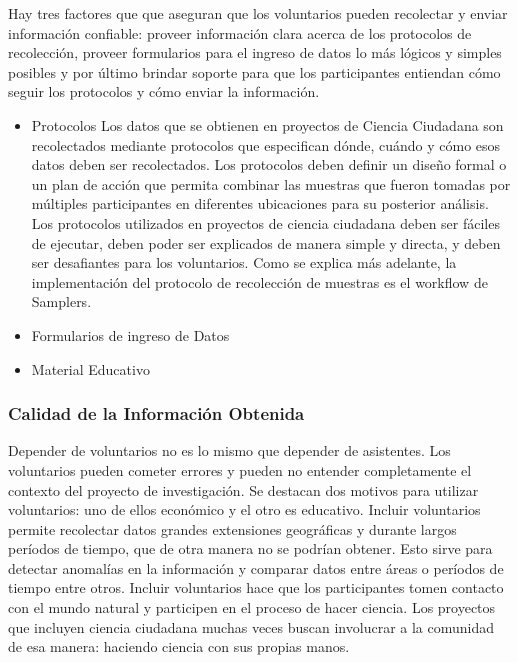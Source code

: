 	Hay tres factores que que aseguran que los voluntarios pueden recolectar y enviar información confiable: proveer información clara acerca de los protocolos de recolección, proveer formularios para el ingreso de datos lo más lógicos y simples posibles y por último brindar soporte para que los participantes entiendan cómo seguir los protocolos y cómo enviar la información.\cite{bonney2009citizen}

\begin{itemize}
	\item {Protocolos}	
		Los datos que se obtienen en proyectos de Ciencia Ciudadana son recolectados mediante protocolos que especifican dónde, cuándo y cómo esos datos deben ser recolectados. Los protocolos deben definir un diseño formal o un plan de acción que permita combinar las muestras que fueron tomadas por múltiples participantes en diferentes ubicaciones para su posterior análisis. Los protocolos utilizados en proyectos de ciencia ciudadana deben ser fáciles de ejecutar, deben poder ser explicados de manera simple y directa, y deben ser desafiantes para los voluntarios.\cite{bonney2009citizen}
		Como se explica más adelante, la implementación del protocolo de recolección de muestras es el workflow de Samplers.
	\item {Formularios de ingreso de Datos}		
	
	\item {Material Educativo}
\end{itemize} 

	
\subsubsection{Calidad de la Información Obtenida}	

Depender de voluntarios no es lo mismo que depender de asistentes. Los voluntarios pueden cometer errores y pueden no entender completamente el contexto del proyecto de investigación. Se destacan dos motivos para utilizar voluntarios: uno de ellos económico y el otro es educativo. Incluir voluntarios permite recolectar datos grandes extensiones geográficas y durante largos períodos de tiempo, que de otra manera no se podrían obtener. Esto sirve para detectar anomalías en la información y comparar datos entre áreas o períodos de tiempo entre otros. Incluir voluntarios hace que los participantes tomen contacto con el mundo natural y participen en el proceso de hacer ciencia. Los proyectos que incluyen ciencia ciudadana muchas veces buscan involucrar a la comunidad de esa manera: haciendo ciencia con sus propias manos.

